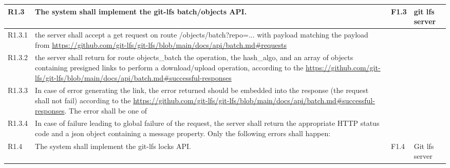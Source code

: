 \begin{landscape}
\begin{longtable}{|p{1cm}|p{19cm}|p{2cm}|p{3cm}|}
        \rowcolor[HTML]{DDDDDD}        R1.3 & The system shall implement the git-lfs batch/objects API.                                                                                                                                                                                                                             & F1.3                  & git lfs server                           \\ \hline
        R1.3.1                              & the server shall accept a get request on route /objects/batch?repo=... with payload matching the payload from \url{https://github.com/git-lfs/git-lfs/blob/main/docs/api/batch.md#requests}                                                                                           &                       &                                          \\\hline
        R1.3.2                              & the server shall return for route objects\_batch the operation, the hash\_algo, and an array of objects containing presigned links to perform a download/upload operation, according to the \url{https://github.com/git-lfs/git-lfs/blob/main/docs/api/batch.md#successful-responses} &                       &                                          \\\hline
        R1.3.3                              & In case of error generating the link, the error returned should be embedded into the response (the request shall not fail) according to the \url{https://github.com/git-lfs/git-lfs/blob/main/docs/api/batch.md#successful-responses}. The error shall be one of                      &                       &                                          \\\hline
        R1.3.4                              & In case of failure leading to global failure of the request, the server shall return the appropriate HTTP status code and a json object containing a message property. Only the following errors shall happen:                                                                        &                       &                                          \\\hline
        \rowcolor[HTML]{DDDDDD}        R1.4 & The system shall implement the git-lfs locks API.                                                                                                                                                                                                                                     & F1.4                  & Git lfs server                           \\ \hline

\end{longtable}
\end{landscape}
